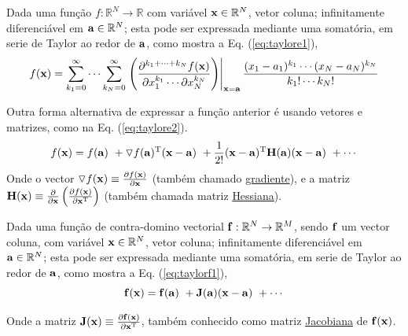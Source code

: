\begin{proposition}\label{prop:taylore}
Dada uma função $f:\mathbb{R}^{N}\rightarrow \mathbb{R}$ com variável $\VECTOR{x} \in \mathbb{R}^{N}$, vetor coluna;
infinitamente diferenciável em $\VECTOR{a} \in \mathbb{R}^{N}$;
esta pode ser expressada mediante uma somatória, em serie de Taylor 
\cite[pp. 187, 207]{zhang2017matrix} \cite{Taylor}  ao redor de $\VECTOR{a}$, como
mostra a Eq. (\ref{eq:taylore1}),
\begin{equation}\label{eq:taylore1}
f(\VECTOR{x}) =\sum _{k_{1}=0}^{\infty }\cdots \sum _{k_{N}=0}^{\infty }\left.\left({\frac {\partial ^{k_{1}+\cdots +k_{N}}f(\VECTOR{x})}{\partial x_{1}^{k_{1}}\cdots \partial x_{N}^{k_{N}}}}\right)\right|_{\VECTOR{x}=\VECTOR{a}} {\frac {(x_{1}-a_{1})^{k_{1}}\cdots (x_{N}-a_{N})^{k_{N}}}{k_{1}!\cdots k_{N}!}}
\end{equation}

Outra forma alternativa de expressar a função anterior é usando vetores e matrizes,
como na Eq. (\ref{eq:taylore2}).
\begin{equation}\label{eq:taylore2}
  f(\VECTOR{x})=f(\VECTOR{a})
      ~+ \triangledown f(\VECTOR{a})^{\transpose} (\VECTOR{x}-\VECTOR{a})
      ~+\frac{1}{2!}(\VECTOR{x}-\VECTOR{a})^{\transpose} \MATRIX{H(\VECTOR{a})}  (\VECTOR{x}-\VECTOR{a})
      ~+\cdots 
\end{equation}
Onde o vector $\triangledown f(\VECTOR{x})\equiv \frac{\partial f(\VECTOR{x})}{\partial \VECTOR{x} }$ 
(também chamado \hyperref[def:gradient]{gradiente}),
e a matriz $\MATRIX{H}(\VECTOR{x})\equiv \frac{\partial }{\partial \VECTOR{x}} \left( \frac{\partial f(\VECTOR{x})}{ \partial \VECTOR{x}^{\transpose} }\right)$
(também chamada matriz \hyperref[def:hessian]{Hessiana}).
\end{proposition}

\begin{proposition}\label{prop:taylorf}
Dada uma função de contra-domino vectorial $\VECTOR{f}:\mathbb{R}^{N}\rightarrow \mathbb{R}^{M}$, 
sendo $\VECTOR{f}$ um vector coluna, com variável $\VECTOR{x} \in \mathbb{R}^{N}$, vetor coluna;
infinitamente diferenciável em $\VECTOR{a} \in \mathbb{R}^{N}$;
esta pode ser expressada mediante uma somatória, em serie de Taylor 
\cite[pp. 393]{levine1999control} \cite{Taylor} ao redor de $\VECTOR{a}$, como
mostra a Eq. (\ref{eq:taylorf1}),
\begin{equation}\label{eq:taylorf1}
\VECTOR{f}(\VECTOR{x}) =\VECTOR{f}(\VECTOR{a})
      ~+ \MATRIX{J}(\VECTOR{a}) (\VECTOR{x}-\VECTOR{a})
      ~+\cdots 
\end{equation}

Onde a matriz $\MATRIX{J}(\VECTOR{x})\equiv \frac{\partial \VECTOR{f}(\VECTOR{x})}{\partial \VECTOR{x}^{\transpose} }$,
também conhecido como matriz \hyperref[def:jacobian]{Jacobiana} de $\VECTOR{f}(\VECTOR{x})$.
\end{proposition}
